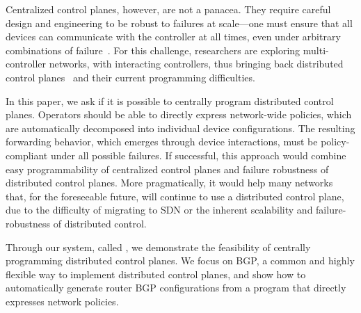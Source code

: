 Centralized control planes, however, are not a panacea. 
They require careful design and engineering to be robust to failures at scale---one must ensure that all devices can communicate with the controller at all times, even under arbitrary combinations of failure~\cite{x,y,z}. For this challenge, researchers are exploring multi-controller networks, with interacting controllers, thus bringing back distributed control planes~\cite{x,y,z} and their current programming difficulties.

In this paper, we ask if it is possible to centrally program distributed control planes.
Operators should be able to directly express network-wide policies, which are automatically decomposed into individual device configurations. The resulting forwarding behavior, which emerges through device interactions, must be policy-compliant under all possible failures.
If successful, this approach would combine easy programmability of centralized control planes and failure robustness of distributed control planes. 
%
More pragmatically, it would help many networks that, for the foreseeable future, will continue to use a distributed control plane, due to the difficulty of migrating to SDN or the inherent scalability and failure-robustness of distributed control.


Through our system, called \sysname, we demonstrate the feasibility of centrally programming distributed control planes. We focus on BGP, a common and highly flexible way to implement distributed control planes, and show how to automatically generate router BGP configurations from a program that directly expresses network policies.



